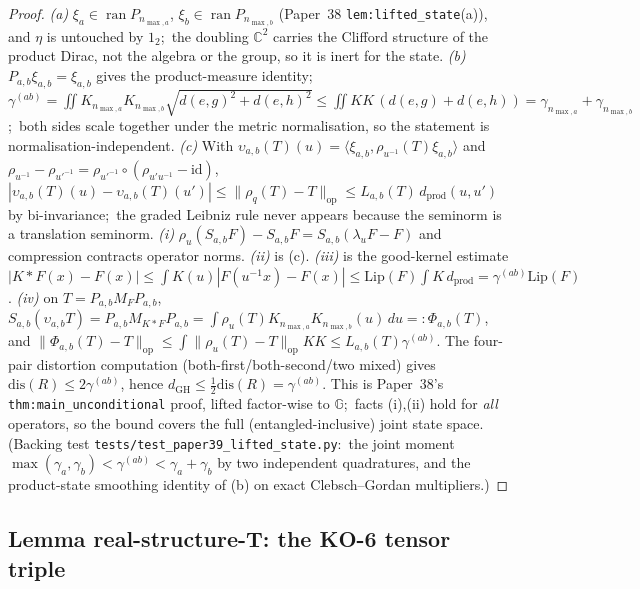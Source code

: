 \documentclass[11pt,a4paper]{article}
\theoremstyle{plain}
\theoremstyle{definition}
\newcommand{\nmaxa}{n_{\max,a}}
\newcommand{\nmaxb}{n_{\max,b}}
\newcommand{\opnorm}[1]{\lVert #1 \rVert_{\mathrm{op}}}
\newcommand{\C}{\mathbb{C}}
\newcommand{\Mat}{M}
\newcommand{\KS}{K}
\begin{document}
\begin{proof}
\emph{(a)} $\xi_a \in \operatorname{ran} P_{\nmaxa}$,
$\xi_b \in \operatorname{ran} P_{\nmaxb}$ (Paper~38
\texttt{lem:lifted\_state}(a)), and $\eta$ is untouched by $1_2$;\ the
doubling $\C^2$ carries the Clifford structure of the product Dirac, not
the algebra or the group, so it is inert for the state.
\emph{(b)} $P_{a,b}\xi_{a,b} = \xi_{a,b}$ gives the product-measure identity;\
$\gamma^{(ab)} = \iint \KS_{\nmaxa}\KS_{\nmaxb}\sqrt{d(e,g)^2 + d(e,h)^2}
\le \iint \KS\KS\,(d(e,g)+d(e,h)) = \gamma_{\nmaxa}+\gamma_{\nmaxb}$;\ both
sides scale together under the metric normalisation, so the statement is
normalisation-independent.
\emph{(c)} With $\upsilon_{a,b}(T)(u) = \langle\xi_{a,b},
\rho_{u^{-1}}(T)\xi_{a,b}\rangle$ and $\rho_{u^{-1}} - \rho_{u'^{-1}} =
\rho_{u'^{-1}}\!\circ(\rho_{u'u^{-1}} - \mathrm{id})$,
$|\upsilon_{a,b}(T)(u) - \upsilon_{a,b}(T)(u')| \le
\opnorm{\rho_q(T) - T} \le L_{a,b}(T)\,d_{\mathrm{prod}}(u,u')$ by
bi-invariance;\ the graded Leibniz rule never appears because the seminorm
is a translation seminorm.
\emph{(i)} $\rho_u(S_{a,b}F) - S_{a,b}F = S_{a,b}(\lambda_u F - F)$ and
compression contracts operator norms. \emph{(ii)} is (c). \emph{(iii)} is
the good-kernel estimate $|\KS*F(x) - F(x)| \le \int\KS(u)|F(u^{-1}x)-F(x)|
\le \mathrm{Lip}(F)\int\KS\,d_{\mathrm{prod}} = \gamma^{(ab)}\mathrm{Lip}(F)$.
\emph{(iv)} on $T = P_{a,b}\Mat_F P_{a,b}$,
$S_{a,b}(\upsilon_{a,b}T) = P_{a,b}\Mat_{\KS*F}P_{a,b} = \int
\rho_u(T)\KS_{\nmaxa}\KS_{\nmaxb}(u)\,du =: \Phi_{a,b}(T)$, and
$\opnorm{\Phi_{a,b}(T) - T} \le \int\opnorm{\rho_u(T)-T}\KS\KS \le
L_{a,b}(T)\gamma^{(ab)}$. The four-pair distortion computation
(both-first/both-second/two mixed) gives $\mathrm{dis}(R) \le 2\gamma^{(ab)}$,
hence $d_{\mathrm{GH}} \le \tfrac12\mathrm{dis}(R) = \gamma^{(ab)}$. This is
Paper~38's \texttt{thm:main\_unconditional} proof, lifted factor-wise to
$\mathbb{G}$;\ facts (i),(ii) hold for \emph{all} operators, so the bound
covers the full (entangled-inclusive) joint state space.  (Backing test
\texttt{tests/test\_paper39\_lifted\_state.py}:\ the joint moment
$\max(\gamma_a, \gamma_b) < \gamma^{(ab)} < \gamma_a + \gamma_b$ by two
independent quadratures, and the product-state smoothing identity of (b) on
exact Clebsch--Gordan multipliers.)
\end{proof}

\subsection{Lemma real-structure-T: the KO-6 tensor triple}\label{sec:real_structure-T}
\end{document}
